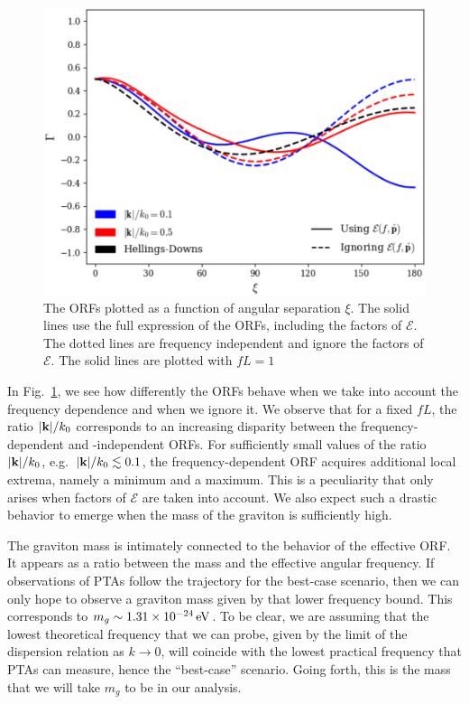 \documentclass[prd,twocolumn,aps,psfig,nofootinbib,nobibnotes,superscriptaddress,preprintnumbers,times]{revtex4-2}
\newcommand{\eV}{\,{\rm eV}}
\begin{document}
\begin{figure}[ht]
    \centering
    \includegraphics[scale=0.48]{fig1.pdf}
    \caption{The ORFs plotted as a function of angular separation $\xi$. The solid lines use the full expression of the ORFs, including the factors of $\mathcal{E}$. The dotted lines are frequency independent and ignore the factors of $\mathcal{E}$. The solid lines are plotted with $fL = 1$}
    \label{fig:orfs}
\end{figure}
In Fig.\ \ref{fig:orfs}, we see how differently the ORFs behave when we take into account the frequency dependence and when we ignore it. We observe that for a fixed $fL$, the ratio $|{\bf k}|/k_0$ corresponds to an increasing disparity between the frequency-dependent and -independent ORFs. For sufficiently small values of the ratio $|{\bf k}|/k_0$, e.g.\ $|{\bf k}|/k_0 \lesssim 0.1$, the frequency-dependent ORF acquires additional local extrema, namely a minimum and a maximum. This is a peculiarity that only arises when factors of $\mathcal{E}$ are taken into account. We also expect such a drastic behavior to emerge when the mass of the graviton is sufficiently high.

The graviton mass is intimately connected to the behavior of the effective ORF. It appears as a ratio between the mass and the effective angular frequency.
If observations of PTAs follow the trajectory for the best-case scenario, then we can only hope to observe a graviton mass given by that lower frequency bound. This corresponds to $m_g \sim 1.31\times 10^{-24} \eV$. To be clear, we are assuming that the lowest theoretical frequency that we can probe, given by the limit of the dispersion relation as $k\rightarrow 0$, will coincide with the lowest practical frequency that PTAs can measure, hence the ``best-case'' scenario. Going forth, this is the mass that we will take $m_g$ to be in our analysis.
\end{document}
